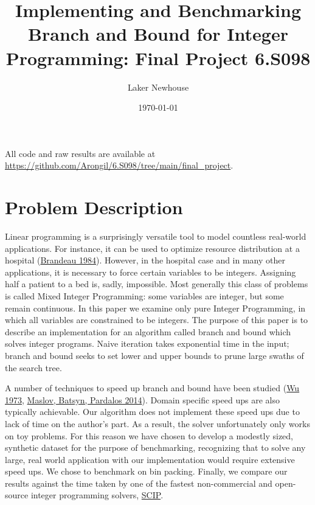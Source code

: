 \documentclass{article}
\title{Implementing and Benchmarking Branch and Bound for Integer Programming: Final Project 6.S098}
\author{Laker Newhouse}
\date{\today}
\begin{document}
\maketitle	

All code and raw results are available at \url{https://github.com/Arongil/6.S098/tree/main/final_project}. \\

\section*{Problem Description}

Linear programming is a surprisingly versatile tool to model countless real-world applications. For instance, it can be used to optimize resource distribution at a hospital (\href{https://pubmed.ncbi.nlm.nih.gov/6232215/}{Brandeau 1984}). However, in the hospital case and in many other applications, it is necessary to force certain variables to be integers. Assigning half a patient to a bed is, sadly, impossible. Most generally this class of problems is called Mixed Integer Programming: some variables are integer, but some remain continuous. In this paper we examine only pure Integer Programming, in which all variables are constrained to be integers. The purpose of this paper is to describe an implementation for an algorithm called branch and bound which solves integer programs. Naive iteration takes exponential time in the input; branch and bound seeks to set lower and upper bounds to prune large swaths of the search tree.

A number of techniques to speed up branch and bound have been studied (\href{https://digitalcommons.usu.edu/cgi/viewcontent.cgi?article=2179&context=gradreports}{Wu 1973}, \href{https://www.researchgate.net/publication/257588965_Speeding_up_branch_and_bound_algorithms_for_solving_the_maximum_clique_problem}{Maslov, Batsyn, Pardalos 2014}). Domain specific speed ups are also typically achievable. Our algorithm does not implement these speed ups due to lack of time on the author's part. As a result, the solver unfortunately only works on toy problems. For this reason we have chosen to develop a modestly sized, synthetic dataset for the purpose of benchmarking, recognizing that to solve any large, real world application with our implementation would require extensive speed ups. We chose to benchmark on bin packing. Finally, we compare our results against the time taken by one of the fastest non-commercial and open-source integer programming solvers, \href{https://www.scipopt.org/}{SCIP}.
\end{document}
